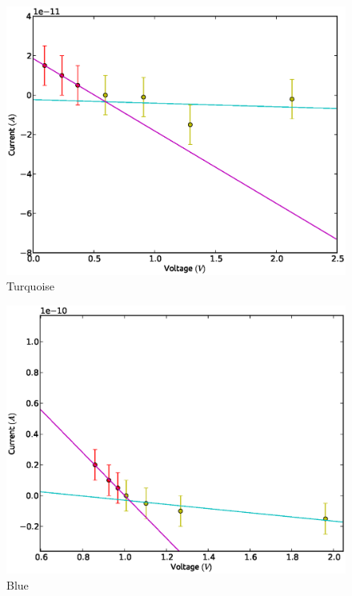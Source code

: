 \documentclass[aps,nofootinbib,onecolumn,groupedaddress,a4paper]{revtex4}
\begin{document}
\begin{figure}[h]
\caption{Turquoise \label{rawplot}}
\includegraphics[width=1.0 \columnwidth]{turq.eps}
\end{figure}

\begin{figure}[h]
\caption{Blue \label{rawplot}}
\includegraphics[width=1.0 \columnwidth]{blue.eps}
\end{figure}
\end{document}
